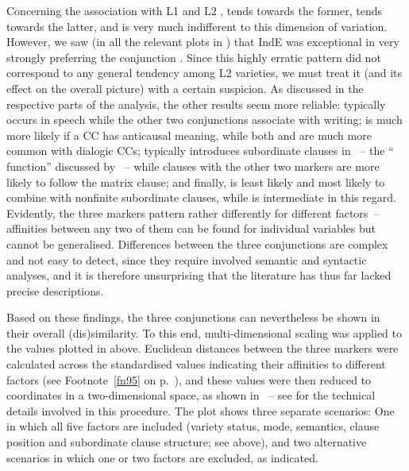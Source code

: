 Concerning the association with L1 and L2 ,  tends towards the former,  tends towards the latter, and  is very much indifferent to this dimension of variation. However, we saw (in all the relevant plots in ) that IndE was exceptional in very strongly preferring the conjunction . Since this highly erratic pattern did not correspond to any general tendency among L2 varieties, we must treat it (and its effect on the overall picture) with a certain suspicion. As discussed in the respective parts of the analysis, the other results seem more reliable:  typically occurs in speech while the other two conjunctions associate with writing;  is much more likely if a CC has anticausal meaning, while both  and  are much more common with dialogic CCs;  typically introduces subordinate clauses in ~– the “ function” discussed by \citet[22]{Altenberg1986}~– while clauses with the other two markers are more likely to follow the matrix clause; and finally,  is least likely and  most likely to combine with nonfinite subordinate clauses, while  is intermediate in this regard. Evidently, the three markers pattern rather differently for different factors~– affinities between any two of them can be found for individual variables but cannot be generalised. Differences between the three conjunctions are complex and not easy to detect, since they require involved semantic and syntactic analyses, and it is therefore unsurprising that the literature has thus far lacked precise descriptions.

Based on these findings, the three conjunctions can nevertheless be shown in their overall (dis)similarity. To this end, multi-dimensional scaling was applied to the values plotted in  above. Euclidean distances between the three markers were calculated across the standardised values indicating their affinities to different factors (see Footnote~\ref{fn95} on p.~\pageref{fn95}), and these values were then reduced to coordinates in a two-dimensional space, as shown in ~– see \citet{Schützler2022} for the technical details involved in this procedure. The plot shows three separate scenarios: One in which all five factors are included (variety status, mode, semantics, clause position and subordinate clause structure; see  above), and two alternative scenarios in which one or two factors are excluded, as indicated.

